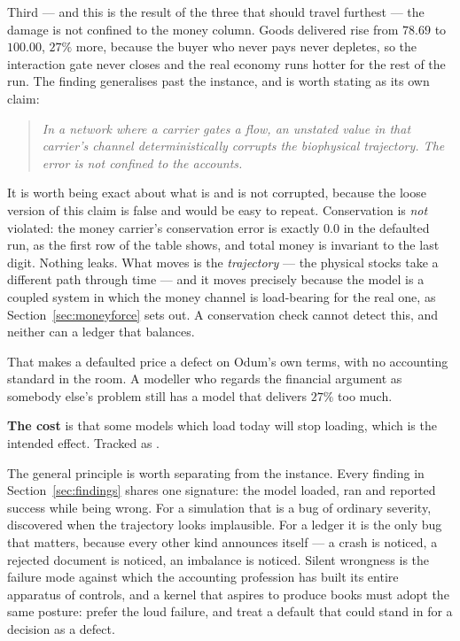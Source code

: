 \documentclass[11pt,a4paper]{article}
\begin{document}
Third --- and this is the result of the three that should travel furthest --- the damage is not confined to the money column. Goods delivered rise from $78.69$ to $100.00$, $27\%$ more, because the buyer who never pays never depletes, so the interaction gate never closes and the real economy runs hotter for the rest of the run. The finding generalises past the instance, and is worth stating as its own claim:

\begin{quote}
\emph{In a network where a carrier gates a flow, an unstated value in that carrier's channel deterministically corrupts the biophysical trajectory. The error is not confined to the accounts.}
\end{quote}

It is worth being exact about what is and is not corrupted, because the loose version of this claim is false and would be easy to repeat. Conservation is \emph{not} violated: the money carrier's conservation error is exactly $0.0$ in the defaulted run, as the first row of the table shows, and total money is invariant to the last digit. Nothing leaks. What moves is the \emph{trajectory} --- the physical stocks take a different path through time --- and it moves precisely because the model is a coupled system in which the money channel is load-bearing for the real one, as Section~\ref{sec:moneyforce} sets out. A conservation check cannot detect this, and neither can a ledger that balances.

That makes a defaulted price a defect on Odum's own terms, with no accounting standard in the room. A modeller who regards the financial argument as somebody else's problem still has a model that delivers $27\%$ too much.

\textbf{The cost} is that some models which load today will stop loading, which is the intended effect. Tracked as .

The general principle is worth separating from the instance. Every finding in Section~\ref{sec:findings} shares one signature: the model loaded, ran and reported success while being wrong. For a simulation that is a bug of ordinary severity, discovered when the trajectory looks implausible. For a ledger it is the only bug that matters, because every other kind announces itself --- a crash is noticed, a rejected document is noticed, an imbalance is noticed. Silent wrongness is the failure mode against which the accounting profession has built its entire apparatus of controls, and a kernel that aspires to produce books must adopt the same posture: prefer the loud failure, and treat a default that could stand in for a decision as a defect.
\end{document}
